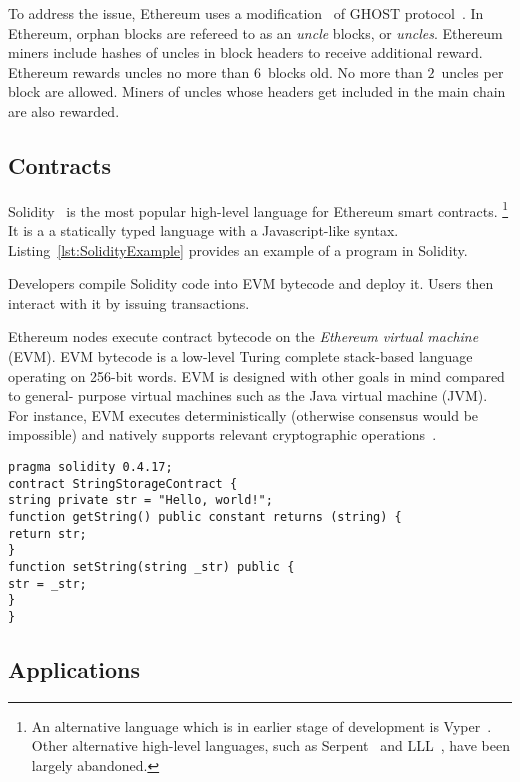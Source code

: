 To address the issue, Ethereum uses a modification~\cite{Lewenberg2015} of GHOST protocol~\cite{Sompolinsky2013, EthdocsMining}.
In Ethereum, orphan blocks are refereed to as an \textit{uncle} blocks, or \textit{uncles}.
Ethereum miners include hashes of uncles in block headers to receive additional reward.
Ethereum rewards uncles no more than $6$~blocks old.
No more than $2$~uncles per block are allowed.
Miners of uncles whose headers get included in the main chain are also rewarded.


\subsection{Contracts}

Solidity~\cite{Solidity17} is the most popular high-level language for Ethereum smart contracts.
\footnote{An alternative language which is in earlier stage of development is Vyper~\cite{Vyper}. Other alternative high-level languages, such as Serpent~\cite{SerpentGithub} and LLL~\cite{Ellison2017}, have been largely abandoned.}
It is a a statically typed language with a Javascript-like syntax.
Listing~\ref{lst:SolidityExample} provides an example of a program in Solidity.

Developers compile Solidity code into EVM bytecode and deploy it.
Users then interact with it by issuing transactions.

Ethereum nodes execute contract bytecode on the \textit{Ethereum virtual machine} (EVM).
EVM bytecode is a low-level Turing complete stack-based language operating on 256-bit words.
EVM is designed with other goals in mind compared to general- purpose virtual machines such as the Java virtual machine (JVM).
For instance, EVM executes deterministically (otherwise consensus would be impossible) and natively supports relevant cryptographic operations~\cite{Buterin2017}.

\begin{lstlisting}[language=Solidity, label={lst:SolidityExample}, caption=A simple contract in Solidity]
pragma solidity 0.4.17;
contract StringStorageContract {
string private str = "Hello, world!";
function getString() public constant returns (string) {
return str;
}
function setString(string _str) public {
str = _str;
}
}
\end{lstlisting}


\subsection{Applications}

